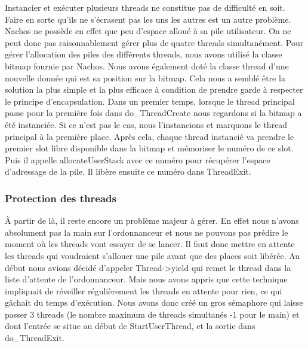 \documentclass[11pt]{article}
\begin{document}
Instancier et exécuter plusieurs threads ne constitue pas de difficulté en soit.
Faire en sorte qu'ils ne s'écrasent pas les uns les autres est un autre problème.
Nachos ne possède en effet que peu d'espace alloué à sa pile utilisateur.
On ne peut donc pas raisonnablement gérer plus de quatre threads simultanément.
Pour gérer l'allocation des piles des différents threads, nous avons utilisé la classe
bitmap fournie par Nachos. Nous avons également doté la classe thread d'une nouvelle donnée
qui est sa position sur la bitmap.
Cela nous a semblé être la solution la plus simple et
la plus efficace à condition de prendre garde à respecter le principe d'encapsulation.
\newline
Dans un premier temps, lorsque le thread principal passe pour la première fois dans \textcolor{red2}{do\_ThreadCreate}
nous regardons si la bitmap a été instanciée. Si ce n'est pas le cas, nous l'instancions
et marquons le thread principal à la première place.
Après cela, chaque thread instancié va prendre le premier slot libre disponible dans
la bitmap et mémoriser le numéro de ce slot. Puis il appelle \textcolor{red2}{allocateUserStack} avec ce
numéro pour récupérer l'espace d'adressage de la pile.
Il libère ensuite ce numéro dans \textcolor{blue2}{ThreadExit}.

\subsubsection{Protection des threads}

À partir de là, il reste encore un problème majeur à gérer. En effet nous n'avons absolument
pas la main sur l'ordonnanceur et nous ne pouvons pas prédire le moment où les threads
vont essayer de se lancer. Il faut donc mettre en attente les threads qui voudraient
s'allouer une pile avant que des places soit libérée. Au début nous avions décidé
d'appeler \textcolor{red2}{Thread->yield} qui remet le thread dans la liste d'attente de l'ordonnanceur.
\newline
Mais nous avons appris que cette technique impliquait de réveiller régulièrement les
threads en attente pour rien, ce qui gâchait du temps d'exécution.
Nous avons donc créé un gros sémaphore qui laisse passer 3 threads (le nombre maximum de threads
simultanés -1 pour le main) et dont l'entrée se situe au début de \textcolor{red2}{StartUserThread}, et la sortie dans \textcolor{red2}{do\_ThreadExit}.
\end{document}
